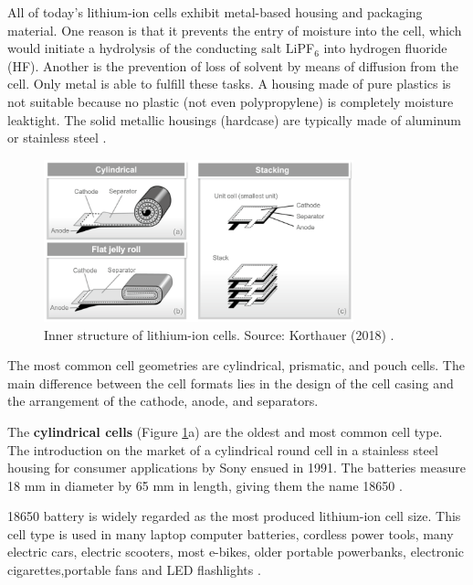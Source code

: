 All of today's lithium-ion cells exhibit metal-based housing and packaging material. One reason is that it prevents the entry of moisture into the cell, which would initiate a hydrolysis of the conducting salt LiPF$_6$ into hydrogen fluoride (HF). Another is the prevention of loss of solvent by means of diffusion from the cell. Only metal is able to fulfill these tasks. A housing made of pure plastics is not suitable because no plastic (not even polypropylene) is completely moisture leaktight. The solid metallic housings (hardcase) are typically made of aluminum or stainless steel \cite{korthauer2018lithium}.

\begin{figure}[ht]
    \centering
    \includegraphics[width=0.8\textwidth]{Images/Chapter1/geometries.png}
    \caption[Inner structure of lithium-ion cells]{Inner structure of lithium-ion cells. Source: Korthauer (2018) \cite{korthauer2018lithium}.}
    \label{fig:geometries}
\end{figure}

The most common cell geometries are cylindrical, prismatic, and pouch cells. The main difference between the cell formats lies in the design of the cell casing and the arrangement of the cathode, anode, and separators. 

The \textbf{cylindrical cells} (Figure \ref{fig:geometries}a) are the oldest and most common cell type. The introduction on the market of a cylindrical round cell in a stainless steel housing for consumer applications by Sony ensued in 1991. The batteries measure 18 mm in diameter by 65 mm in length, giving them the name 18650 \cite{korthauer2018lithium}.

18650 battery is widely regarded as the most produced lithium-ion cell size. This cell type is used in many laptop computer batteries, cordless power tools, many electric cars, electric scooters, most e-bikes, older portable powerbanks, electronic cigarettes,portable fans and LED flashlights \cite{batterytypes}.


